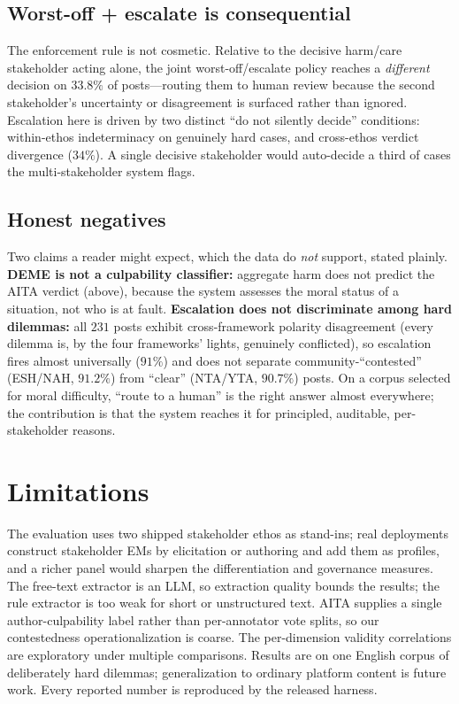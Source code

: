 \documentclass[journal]{IEEEtran}
\begin{document}
\subsection{Worst-off + escalate is consequential}
The enforcement rule is not cosmetic. Relative to the decisive harm/care
stakeholder acting alone, the joint worst-off/escalate policy reaches a
\emph{different} decision on $33.8\%$ of posts---routing them to human review
because the second stakeholder's uncertainty or disagreement is surfaced rather
than ignored. Escalation here is driven by two distinct ``do not silently
decide'' conditions: within-ethos indeterminacy on genuinely hard cases, and
cross-ethos verdict divergence ($34\%$). A single decisive stakeholder would
auto-decide a third of cases the multi-stakeholder system flags.

\subsection{Honest negatives}
Two claims a reader might expect, which the data do \emph{not} support, stated
plainly. \textbf{DEME is not a culpability classifier:} aggregate harm does not
predict the AITA verdict (above), because the system assesses the moral status
of a situation, not who is at fault. \textbf{Escalation does not discriminate
among hard dilemmas:} all $231$ posts exhibit cross-framework polarity
disagreement (every dilemma is, by the four frameworks' lights, genuinely
conflicted), so escalation fires almost universally ($91\%$) and does not
separate community-``contested'' (ESH/NAH, $91.2\%$) from ``clear'' (NTA/YTA,
$90.7\%$) posts. On a corpus selected for moral difficulty, ``route to a human''
is the right answer almost everywhere; the contribution is that the system
reaches it for principled, auditable, per-stakeholder reasons.

\section{Limitations}
The evaluation uses two shipped stakeholder ethos as stand-ins; real deployments
construct stakeholder EMs by elicitation or authoring and add them as profiles,
and a richer panel would sharpen the differentiation and governance measures.
The free-text extractor is an LLM, so extraction quality bounds the results; the
rule extractor is too weak for short or unstructured text. AITA supplies a
single author-culpability label rather than per-annotator vote splits, so our
contestedness operationalization is coarse. The per-dimension validity
correlations are exploratory under multiple comparisons. Results are on one
English corpus of deliberately hard dilemmas; generalization to ordinary
platform content is future work. Every reported number is reproduced by the
released harness.
\end{document}
